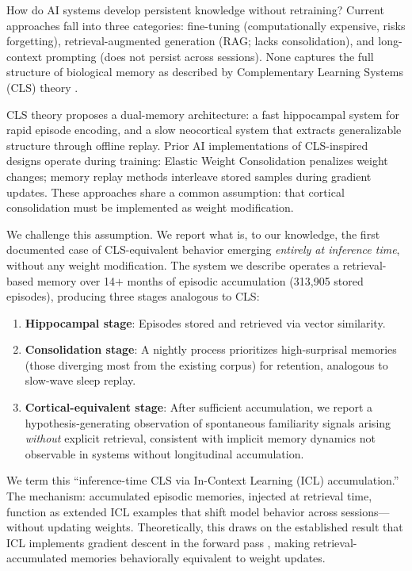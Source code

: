 \documentclass[11pt]{article}
\begin{document}
How do AI systems develop persistent knowledge without retraining?
Current approaches fall into three categories: fine-tuning
(computationally expensive, risks forgetting), retrieval-augmented
generation (RAG; lacks consolidation), and long-context prompting
(does not persist across sessions). None captures the full structure
of biological memory as described by Complementary Learning Systems
(CLS) theory \citep{mcclelland1995}.

CLS theory proposes a dual-memory architecture: a fast hippocampal
system for rapid episode encoding, and a slow neocortical system that
extracts generalizable structure through offline replay. Prior AI
implementations of CLS-inspired designs operate during training:
Elastic Weight Consolidation \citep{kirkpatrick2017} penalizes weight
changes; memory replay methods interleave stored samples during
gradient updates. These approaches share a common assumption: that
cortical consolidation must be implemented as weight modification.

We challenge this assumption. We report what is, to our knowledge, the
first documented case of CLS-equivalent behavior emerging
\textit{entirely at inference time}, without any weight modification.
The system we describe operates a retrieval-based memory over 14$+$
months of episodic accumulation (313,905 stored episodes), producing
three stages analogous to CLS:

\begin{enumerate}
  \item \textbf{Hippocampal stage}: Episodes stored and retrieved via
    vector similarity.
  \item \textbf{Consolidation stage}: A nightly process prioritizes
    high-surprisal memories (those diverging most from the existing
    corpus) for retention, analogous to slow-wave sleep replay.
  \item \textbf{Cortical-equivalent stage}: After sufficient
    accumulation, we report a hypothesis-generating observation of
    spontaneous familiarity signals arising \textit{without} explicit
    retrieval, consistent with implicit memory dynamics not observable
    in systems without longitudinal accumulation.
\end{enumerate}

We term this ``inference-time CLS via In-Context Learning (ICL)
accumulation.'' The mechanism: accumulated episodic memories, injected
at retrieval time, function as extended ICL examples that shift model
behavior across sessions---without updating weights. Theoretically,
this draws on the established result that ICL implements gradient
descent in the forward pass \citep{vonoswald2023}, making
retrieval-accumulated memories behaviorally equivalent to weight
updates.
\end{document}
